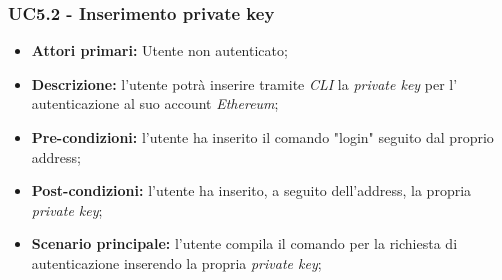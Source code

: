 \subsubsection{UC5.2 - Inserimento private key\glo}
\begin{itemize}
	\item \textbf{Attori primari:} Utente non autenticato;
	\item \textbf{Descrizione:} l'utente potrà inserire tramite \textit{CLI\glo} la \textit{private key\glo} per l' autenticazione al suo account \textit{Ethereum\glos}; 
	\item \textbf{Pre-condizioni:} l'utente ha inserito il comando "login" seguito dal proprio address;
	\item \textbf{Post-condizioni:} l'utente ha inserito, a seguito dell'address, la propria \textit{private key\glos};
	\item \textbf{Scenario principale:} l'utente compila il comando per la richiesta di autenticazione inserendo la propria \textit{private key\glos};
\end{itemize}